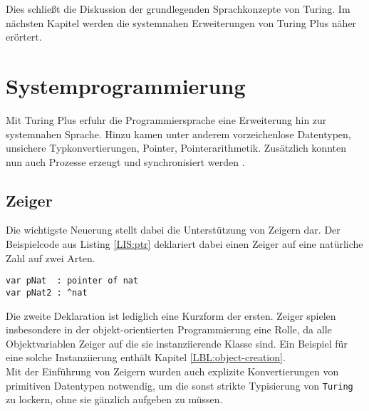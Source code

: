 Dies schlie\ss{}t die Diskussion der grundlegenden Sprachkonzepte von Turing. Im n\"achsten Kapitel werden die systemnahen Erweiterungen von Turing Plus n\"aher er\"ortert.

\section{Systemprogrammierung}
\label{chap:system}

Mit Turing Plus erfuhr die Programmiersprache eine Erweiterung hin zur systemnahen Sprache. Hinzu kamen unter anderem vorzeichenlose Datentypen, unsichere Typkonvertierungen, Pointer, Pointerarithmetik. Zus\"atzlich konnten nun auch Prozesse erzeugt und synchronisiert werden \cite{Holt:88}.

\subsection{Zeiger}

Die wichtigste Neuerung stellt dabei die Unterst\"utzung von Zeigern dar. Der Beispielcode aus Listing \ref{LIS:ptr} deklariert dabei einen Zeiger auf eine nat\"urliche Zahl auf zwei Arten.

\lstset{label=LIS:ptr}
\begin{table}[h!]
\begin{lstlisting}
var pNat  : pointer of nat
var pNat2 : ^nat
\end{lstlisting}
\end{table}

Die zweite Deklaration ist lediglich eine Kurzform der ersten. Zeiger spielen insbesondere in der objekt-orientierten Programmierung eine Rolle, da alle Objektvariablen Zeiger auf die sie instanziierende Klasse sind. Ein Beispiel f\"ur eine solche Instanziierung enth\"alt Kapitel \ref{LBL:object-creation}. \\
Mit der Einf\"uhrung von Zeigern wurden auch explizite Konvertierungen von primitiven Datentypen notwendig, um die sonst strikte Typisierung von \texttt{Turing} zu lockern, ohne sie g\"anzlich aufgeben zu m\"ussen.

